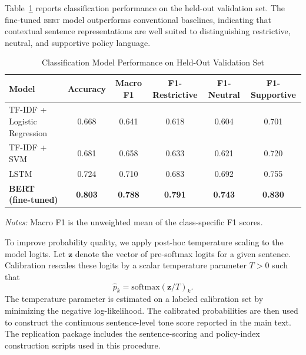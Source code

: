 \documentclass[12pt]{article}
\newcommand{\BERT}{\textsc{bert}}
\begin{document}
\begin{appendices}
Table~\ref{tab:model} reports classification performance on the held-out validation
set. The fine-tuned \BERT{} model outperforms conventional baselines, indicating that
contextual sentence representations are well suited to distinguishing restrictive,
neutral, and supportive policy language.

\begin{table}[H]
\centering
\caption{Classification Model Performance on Held-Out Validation Set}
\label{tab:model}
\begin{threeparttable}
\small
\begin{tabular}{lccccc}
\toprule
\textbf{Model} & \textbf{Accuracy} & \textbf{Macro F1}
  & \textbf{F1-Restrictive} & \textbf{F1-Neutral} & \textbf{F1-Supportive} \\
\midrule
TF-IDF + Logistic Regression & 0.668 & 0.641 & 0.618 & 0.604 & 0.701 \\
TF-IDF + SVM                 & 0.681 & 0.658 & 0.633 & 0.621 & 0.720 \\
LSTM                         & 0.724 & 0.710 & 0.683 & 0.692 & 0.755 \\
\textbf{BERT (fine-tuned)}   & \textbf{0.803} & \textbf{0.788}
  & \textbf{0.791} & \textbf{0.743} & \textbf{0.830} \\
\bottomrule
\end{tabular}
\begin{tablenotes}
\small
\item \textit{Notes:} Macro F1 is the unweighted mean of the class-specific F1 scores.
\end{tablenotes}
\end{threeparttable}
\end{table}

To improve probability quality, we apply post-hoc temperature scaling to the model
logits. Let $\mathbf{z}$ denote the vector of pre-softmax logits for a given sentence.
Calibration rescales these logits by a scalar temperature parameter $T > 0$ such that
\[
\hat{p}_k = \mathrm{softmax}(\mathbf{z}/T)_k.
\]
The temperature parameter is estimated on a labeled calibration set by minimizing the
negative log-likelihood. The calibrated probabilities are then used to construct the
continuous sentence-level tone score reported in the main text. The replication
package includes the sentence-scoring and policy-index construction scripts used in
this procedure.




\end{appendices}
\end{document}
